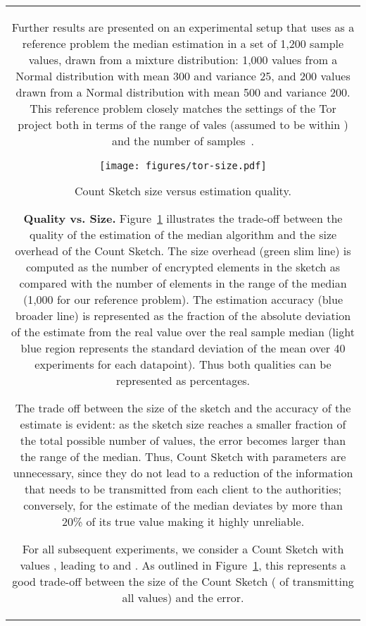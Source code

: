 \documentclass[conference]{IEEEtran}
\newcommand{\descr}[1]{\medskip \noindent \textbf{#1}}
\begin{document}
\begin{figure*}[ht!]
{\begin{tabular}{|c|}
Further results are presented on an experimental setup that uses as a reference problem the median estimation in a set of 1,200 sample values, drawn from a mixture distribution: 1,000 values from a Normal distribution with mean 300 and variance 25, and 200 values drawn from a Normal distribution with mean 500 and variance 200. This reference problem closely matches the settings of the Tor project both in terms of the range of vales (assumed to be within ) and the number of samples~\cite{elahi2014privex}.

\begin{figure}[t]
\centering
\texttt{[image: figures/tor-size.pdf]}
\vspace{-0.2cm}
\caption{\label{fig:tor-sizes} Count Sketch size versus estimation quality.}
\vspace{-0.2cm}
\end{figure}

\descr{Quality vs. Size.} Figure~\ref{fig:tor-sizes} illustrates the trade-off between the quality of the estimation of the median algorithm and the size overhead of the Count Sketch. The size overhead (green slim line) is computed as the number of encrypted elements in the sketch as compared with the number of elements in the range of the median (1,000 for our reference problem). The estimation accuracy (blue broader line) is represented as the fraction of the absolute deviation of the estimate from the real value over the real sample median (light blue region represents the standard deviation of the mean over 40 experiments for each datapoint). Thus both qualities can be represented as percentages. 

The trade off between the size of the sketch and the accuracy of the estimate is evident: as the sketch size reaches a smaller fraction of the total possible number of values, the error becomes larger than the range of the median. Thus, Count Sketch with parameters  are unnecessary, since they do not lead to a reduction of the information that needs to be transmitted from each client to the authorities; conversely, for  the estimate of the median deviates by more than 20\% of its true value making it highly unreliable.

For all subsequent experiments, we consider a Count Sketch with values , leading to  and . As outlined in Figure~\ref{fig:tor-sizes}, this represents a good trade-off between the size of the Count Sketch ( of transmitting all values) and the error. 


\end{tabular}}
\end{figure*}
\end{document}
